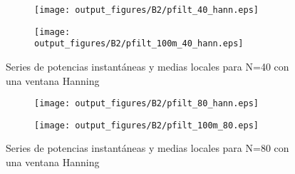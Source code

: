 \documentclass{article}
\begin{document}
            
             \begin{figure}[h]
                \centering
                \begin{subfigure}
                    \centering          \texttt{[image: output\_figures/B2/pfilt\_40\_hann.eps]}
               \end{subfigure}
               \begin{subfigure}
                    \centering          \texttt{[image: output\_figures/B2/pfilt\_100m\_40\_hann.eps]}
               \end{subfigure}    
               \caption{Series de potencias instantáneas y medias locales para N=40 con una ventana Hanning}
                \label{fig:sup_rugosas}
            \end{figure}
            \clearpage
            \begin{figure}[h]
                \centering
                \begin{subfigure}
                    \centering          \texttt{[image: output\_figures/B2/pfilt\_80\_hann.eps]}
               \end{subfigure}
               \begin{subfigure}
                    \centering          \texttt{[image: output\_figures/B2/pfilt\_100m\_80.eps]}
               \end{subfigure}    
               \caption{Series de potencias instantáneas y medias locales para N=80 con una ventana Hanning}
                \label{fig:sup_rugosas}
            \end{figure}
\end{document}
